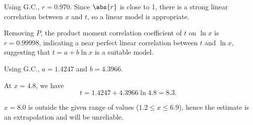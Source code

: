 \begin{solution}
    \begin{ppart}
        Using G.C., $r = 0.970$. Since $\abs{r}$ is close to 1, there is a strong linear correlation between $x$ and $t$, so a linear model is appropriate.
    \end{ppart}
    \begin{ppart}
        \begin{figure}[H]
            \centering
        \end{figure}
    \end{ppart}
    \begin{ppart}
        Removing $P$, the product moment correlation coefficient of $t$ on $\ln x$ is $r = 0.99998$, indicating a near perfect linear correlation between $t$ and $\ln x$, suggesting that $t = a + b \ln x$ is a suitable model.
    \end{ppart}
    \begin{ppart}
        Using G.C., $a = 1.4247$ and $b = 4.3966$.
    \end{ppart}
    \begin{ppart}
        At $x = 4.8$, we have \[t = 1.4247 + 4.3966 \ln 4.8 = 8.3.\]
    \end{ppart}
    \begin{ppart}
        $x = 8.0$ is outside the given range of values ($1.2 \leq x \leq 6.9$), hence the estimate is an extrapolation and will be unreliable.
    \end{ppart}
\end{solution}

